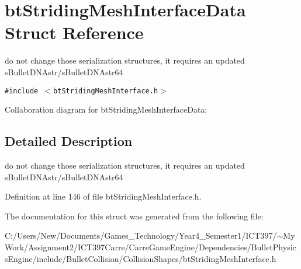 \hypertarget{structbt_striding_mesh_interface_data}{
\section{btStridingMeshInterfaceData Struct Reference}
\label{structbt_striding_mesh_interface_data}
}
do not change those serialization structures, it requires an updated sBulletDNAstr/sBulletDNAstr64  


{\tt \#include $<$btStridingMeshInterface.h$>$}

Collaboration diagram for btStridingMeshInterfaceData:

\subsection{Detailed Description}
do not change those serialization structures, it requires an updated sBulletDNAstr/sBulletDNAstr64 

Definition at line 146 of file btStridingMeshInterface.h.

The documentation for this struct was generated from the following file:\begin{CompactItemize}
\item 
C:/Users/New/Documents/Games\_\-Technology/Year4\_\-Semester1/ICT397/$\sim$My Work/Assignment2/ICT397Carre/CarreGameEngine/Dependencies/BulletPhysicsEngine/include/BulletCollision/CollisionShapes/btStridingMeshInterface.h\end{CompactItemize}
